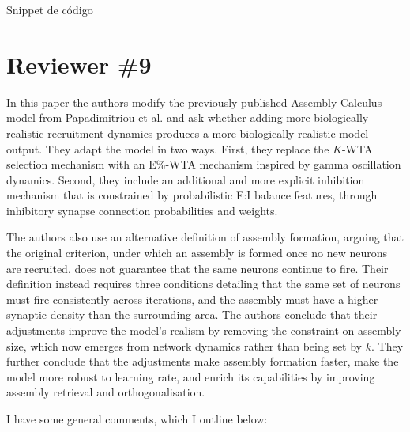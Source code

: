 \documentclass[a4paper, 11pt]{article}
\begin{document}
Snippet de código
\section*{Reviewer \#9}

In this paper the authors modify the previously published Assembly Calculus model from Papadimitriou et al. and ask whether adding more biologically realistic recruitment dynamics produces a more biologically realistic model output. They adapt the model in two ways. First, they replace the $K$-WTA selection mechanism with an E\%-WTA mechanism inspired by gamma oscillation dynamics. Second, they include an additional and more explicit inhibition mechanism that is constrained by probabilistic E:I balance features, through inhibitory synapse connection probabilities and weights.

The authors also use an alternative definition of assembly formation, arguing that the original criterion, under which an assembly is formed once no new neurons are recruited, does not guarantee that the same neurons continue to fire. Their definition instead requires three conditions detailing that the same set of neurons must fire consistently across iterations, and the assembly must have a higher synaptic density than the surrounding area. The authors conclude that their adjustments improve the model's realism by removing the constraint on assembly size, which now emerges from network dynamics rather than being set by $k$. They further conclude that the adjustments make assembly formation faster, make the model more robust to learning rate, and enrich its capabilities by improving assembly retrieval and orthogonalisation.

I have some general comments, which I outline below:
\end{document}
